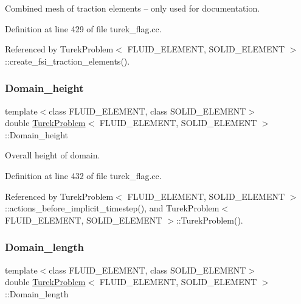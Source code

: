 Combined mesh of traction elements -- only used for documentation. 



Definition at line 429 of file turek\+\_\+flag.\+cc.



Referenced by Turek\+Problem$<$ F\+L\+U\+I\+D\+\_\+\+E\+L\+E\+M\+E\+N\+T, S\+O\+L\+I\+D\+\_\+\+E\+L\+E\+M\+E\+N\+T $>$\+::create\+\_\+fsi\+\_\+traction\+\_\+elements().

\mbox{\label{classTurekProblem_a24d68af05e815f7164e30f53ce7357ce}} 
\subsubsection{\texorpdfstring{Domain\+\_\+height}{Domain\_height}}
{\footnotesize\ttfamily template$<$class F\+L\+U\+I\+D\+\_\+\+E\+L\+E\+M\+E\+NT, class S\+O\+L\+I\+D\+\_\+\+E\+L\+E\+M\+E\+NT$>$ \\
double \hyperlink{classTurekProblem}{Turek\+Problem}$<$ F\+L\+U\+I\+D\+\_\+\+E\+L\+E\+M\+E\+NT, S\+O\+L\+I\+D\+\_\+\+E\+L\+E\+M\+E\+NT $>$\+::Domain\+\_\+height\hspace{0.3cm}{\ttfamily [private]}}



Overall height of domain. 



Definition at line 432 of file turek\+\_\+flag.\+cc.



Referenced by Turek\+Problem$<$ F\+L\+U\+I\+D\+\_\+\+E\+L\+E\+M\+E\+N\+T, S\+O\+L\+I\+D\+\_\+\+E\+L\+E\+M\+E\+N\+T $>$\+::actions\+\_\+before\+\_\+implicit\+\_\+timestep(), and Turek\+Problem$<$ F\+L\+U\+I\+D\+\_\+\+E\+L\+E\+M\+E\+N\+T, S\+O\+L\+I\+D\+\_\+\+E\+L\+E\+M\+E\+N\+T $>$\+::\+Turek\+Problem().

\mbox{\label{classTurekProblem_aff485942ff327ccfcafd3608910ef635}} 
\subsubsection{\texorpdfstring{Domain\+\_\+length}{Domain\_length}}
{\footnotesize\ttfamily template$<$class F\+L\+U\+I\+D\+\_\+\+E\+L\+E\+M\+E\+NT, class S\+O\+L\+I\+D\+\_\+\+E\+L\+E\+M\+E\+NT$>$ \\
double \hyperlink{classTurekProblem}{Turek\+Problem}$<$ F\+L\+U\+I\+D\+\_\+\+E\+L\+E\+M\+E\+NT, S\+O\+L\+I\+D\+\_\+\+E\+L\+E\+M\+E\+NT $>$\+::Domain\+\_\+length\hspace{0.3cm}{\ttfamily [private]}}




